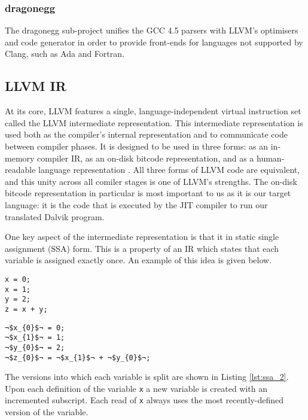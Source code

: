 \subsubsection*{dragonegg}

The dragonegg sub-project unifies the GCC 4.5 parsers with LLVM's optimisers and code generator in order to provide front-ends for languages not supported by Clang, such as Ada and Fortran.

\subsection*{LLVM IR}

At its core, LLVM features a single, language-independent virtual instruction set called the LLVM intermediate representation. This intermediate representation is used both as the compiler's internal representation and to communicate code between compiler phases. It is designed to be used in three forms: as an in-memory compiler IR, as an on-disk bitcode representation, and as a human-readable language representation \cite{llvm_ref}. All three forms of LLVM code are equivalent, and this unity across all comiler stages is one of LLVM's strengths. The on-disk bitcode representation in particular is most important to us as it is our target language: it is the code that is executed by the JIT compiler to run our translated Dalvik program.

One key aspect of the intermediate representation is that it in static single assignment (SSA) form. This is a property of an IR which states that each variable is assigned exactly once. An example of this idea is given below.

\lstset{
	language=C,
	basicstyle=\small,
	stringstyle=\ttfamily
}

\begin{lstlisting}[frame=single, caption={Code for SSA example}, label=lst:ssa_1]
x = 0;
x = 1;
y = 2;
z = x + y;
\end{lstlisting}


\begin{lstlisting}[frame=single, escapechar={¬}, caption={Example of SSA form}, label=lst:ssa_2]
¬$x_{0}$¬ = 0;
¬$x_{1}$¬ = 1;
¬$y_{0}$¬ = 2;
¬$z_{0}$¬ = ¬$x_{1}$¬ + ¬$y_{0}$¬;
\end{lstlisting}

The versions into which each variable is split are shown in Listing \ref{lst:ssa_2}. Upon each definition of the variable \verb|x| a new variable is created with an incremented subscript. Each read of \verb|x| always uses the most recently-defined version of the variable.


